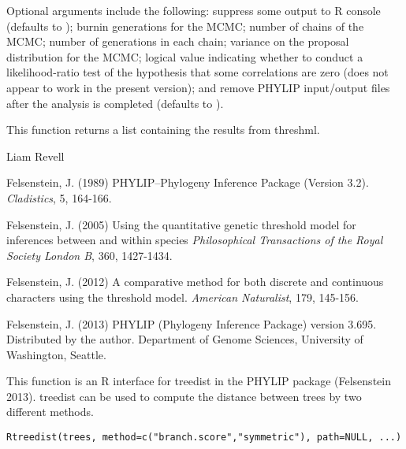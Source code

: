 \documentclass[a4paper]{book}
\begin{document}
%
\begin{Details}\relax
Optional arguments include the following:  suppress some output to R console (defaults to );  burnin generations for the MCMC;  number of chains of the MCMC;  number of generations in each chain;  variance on the proposal distribution for the MCMC;  logical value indicating whether to conduct a likelihood-ratio test of the hypothesis that some correlations are zero (does not appear to work in the present version); and  remove PHYLIP input/output files after the analysis is completed (defaults to ).
\end{Details}
%
\begin{Value}
This function returns a list containing the results from threshml.
\end{Value}
%
\begin{Author}\relax
Liam Revell 
\end{Author}
%
\begin{References}\relax
Felsenstein, J. (1989) PHYLIP--Phylogeny Inference Package (Version 3.2). \emph{Cladistics}, 5, 164-166.

Felsenstein, J. (2005) Using the quantitative genetic threshold model for inferences between and within species \emph{Philosophical Transactions of the Royal Society London B}, 360, 1427-1434.

Felsenstein, J. (2012) A comparative method for both discrete and continuous characters using the threshold model. \emph{American Naturalist}, 179, 145-156.

Felsenstein, J. (2013) PHYLIP (Phylogeny Inference Package) version 3.695. Distributed by the author. Department of Genome Sciences, University of Washington, Seattle.
\end{References}
%
\begin{SeeAlso}\relax
{}
\end{SeeAlso}
%
\begin{Description}\relax
This function is an R interface for treedist in the PHYLIP package (Felsenstein 2013). treedist can be used to compute the distance between trees by two different methods.
\end{Description}
%
\begin{Usage}
\begin{verbatim}
Rtreedist(trees, method=c("branch.score","symmetric"), path=NULL, ...)
\end{verbatim}
\end{Usage}
\end{document}
